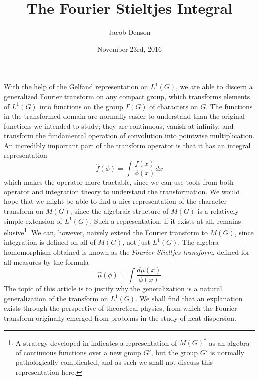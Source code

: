 \documentclass{article}
\title{The Fourier Stieltjes Integral}
\author{Jacob Denson}
\date{November 23rd, 2016}
\theoremstyle{plain}
\theoremstyle{definition}
\begin{document}
\maketitle

With the help of the Gelfand representation on $L^1(G)$, we are able to discern a generalized Fourier transform on any compact group, which transforms elements of $L^1(G)$ into functions on the group $\Gamma(G)$ of characters on $G$. The functions in the transformed domain are normally easier to understand than the original functions we intended to study; they are continuous, vanish at infinity, and transform the fundamental operation of convolution into pointwise multiplication. An incredibly important part of the transform operator is that it has an integral representation
%
\[ \widehat{f}(\phi) = \int \frac{f(x)}{\phi(x)} dx \]
%
which makes the operator more tractable, since we can use tools from both operator and integration theory to understand the transformation. We would hope that we might be able to find a nice representation of the character transform on $M(G)$, since the algebraic structure of $M(G)$ is a relatively simple extension of $L^1(G)$. Such a representation, if it exists at all, remains elusive\footnote{A strategy developed in \cite{taylor} indicates a representation of $M(G)^*$ as an algebra of continuous functions over a new group $G'$, but the group $G'$ is normally pathologically complicated, and as such we shall not discuss this representation here.}. We can, however, naively extend the Fourier transform to $M(G)$, since integration is defined on all of $M(G)$, not just $L^1(G)$. The algebra homomorphism obtained is known as the {\it Fourier-Stieltjes transform}, defined for all measures by the formula
%
\[ \widehat{\mu}(\phi) = \int \frac{d\mu(x)}{\phi(x)} \]
%
The topic of this article is to justify why the generalization is a natural generalization of the transform on $L^1(G)$. We shall find that an explanation exists through the perspective of theoretical physics, from which the Fourier transform originally emerged from problems in the study of heat dispersion.
\end{document}
